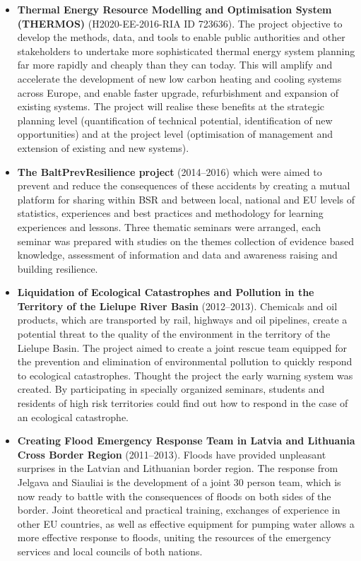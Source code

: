 \documentclass[a4paper,11pt]{article}
\begin{document}
\begin{itemize}
\item	\textbf{Thermal Energy Resource Modelling and Optimisation System (THERMOS)} (H2020-EE-2016-RIA ID 723636). The project objective to develop the methods, data, and tools to enable public authorities and other stakeholders to undertake more sophisticated thermal energy system planning far more rapidly and cheaply than they can today. This will amplify and accelerate the development of new low carbon heating and cooling systems across Europe, and enable faster upgrade, refurbishment and expansion of existing systems.
  The project will realise these benefits at the strategic planning level (quantification of technical potential, identification of new opportunities) and at the project level (optimisation of management and extension of existing and new systems).
  
\item \textbf{The BaltPrevResilience project} (2014--2016) which were aimed to prevent and reduce the consequences of these accidents by creating a mutual platform for sharing within BSR and between local, national and EU levels of statistics, experiences and best practices and methodology for learning experiences and lessons. Three thematic seminars were arranged, each seminar was prepared with studies on the themes collection of evidence based knowledge, assessment of information and data and awareness raising and building resilience.

\pagebreak
\item \textbf{Liquidation of Ecological Catastrophes and Pollution in the Territory of the Lielupe River Basin} (2012--2013). Chemicals and oil products, which are transported by rail, highways and oil pipelines, create a potential threat to the quality of the environment in the territory of the Lielupe Basin. The project aimed to create a joint rescue team equipped for the prevention and elimination of environmental pollution to quickly respond to ecological catastrophes. Thought the project the early warning system was created. By participating in specially organized seminars, students and residents of high risk territories could find out how to respond in the case of an ecological catastrophe.

\item \textbf{Creating Flood Emergency Response Team in Latvia and Lithuania Cross Border Region} (2011--2013). Floods have provided unpleasant surprises in the Latvian and Lithuanian border region. The response from Jelgava and Siauliai is the development of a joint 30 person team, which is now ready to battle with the consequences of floods on both sides of the border. Joint theoretical and practical training, exchanges of experience in other EU countries, as well as effective equipment for pumping water allows a more effective response to floods, uniting the resources of the emergency services and local councils of both nations.
\end{itemize}
\end{document}
